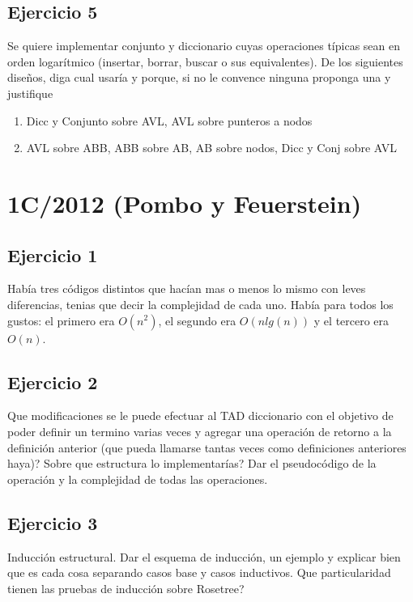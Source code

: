 \documentclass[10pt, a4paper]{article}
\begin{document}
\subsection*{Ejercicio 5}

Se quiere implementar conjunto y diccionario cuyas operaciones t\'ipicas sean en orden logar\'itmico (insertar, borrar, buscar o sus equivalentes). De los siguientes diseños, diga cual usar\'ia y porque, si no le convence ninguna proponga una y justifique
\begin{enumerate}
 \item Dicc y Conjunto sobre AVL, AVL sobre punteros a nodos
 \item AVL sobre ABB, ABB sobre AB, AB sobre nodos, Dicc y Conj sobre AVL
\end{enumerate}

\newpage
\section{1C/2012 (Pombo y Feuerstein)}

\subsection*{Ejercicio 1}
Hab\'ia tres c\'odigos distintos que hac\'ian mas o menos lo mismo con leves diferencias, tenias que decir la complejidad de cada uno. Hab\'ia para todos los gustos: el primero era $O(n^2)$, el segundo era $O(nlg(n))$ y el tercero era $O(n)$.

\subsection*{Ejercicio 2}
Que modificaciones se le puede efectuar al TAD diccionario con el objetivo de poder definir un termino varias veces y agregar una operaci\'on de retorno a la definici\'on anterior (que pueda llamarse tantas veces como definiciones anteriores haya)? Sobre que estructura lo implementar\'ias? Dar el pseudoc\'odigo de la operaci\'on y la complejidad de todas las operaciones.

\subsection*{Ejercicio 3}
Inducci\'on estructural. Dar el esquema de inducci\'on, un ejemplo y explicar bien que es cada cosa separando casos base y casos inductivos. Que particularidad tienen las pruebas de inducci\'on sobre Rosetree?
\end{document}
